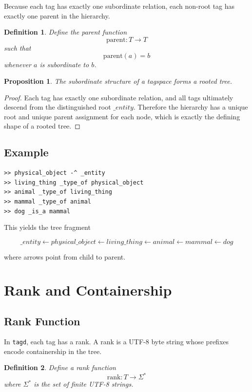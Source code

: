 \documentclass{article}
\newtheorem{definition}{Definition}[section]
\newtheorem{proposition}{Proposition}[section]
\begin{document}
Because each tag has exactly one subordinate relation, each non-root tag has
exactly one parent in the hierarchy.

\begin{definition}
Define the parent function
\[
\mathrm{parent}: T \to T
\]
such that
\[
\mathrm{parent}(a) = b
\]
whenever $a$ is subordinate to $b$.
\end{definition}

\begin{proposition}
The subordinate structure of a tagspace forms a rooted tree.
\end{proposition}

\begin{proof}
Each tag has exactly one subordinate relation, and all tags ultimately
descend from the distinguished root $\_entity$. Therefore the hierarchy has
a unique root and unique parent assignment for each node, which is exactly
the defining shape of a rooted tree.
\end{proof}

\subsection{Example}

\begin{verbatim}
>> physical_object -^ _entity
>> living_thing _type_of physical_object
>> animal _type_of living_thing
>> mammal _type_of animal
>> dog _is_a mammal
\end{verbatim}

This yields the tree fragment

\[
\_entity \leftarrow physical\_object \leftarrow living\_thing \leftarrow
animal \leftarrow mammal \leftarrow dog
\]

where arrows point from child to parent.

\section{Rank and Containership}

\subsection{Rank Function}

In \texttt{tagd}, each tag has a rank. A rank is a UTF-8 byte string whose
prefixes encode containership in the tree.

\begin{definition}
Define a rank function
\[
\mathrm{rank}: T \to \Sigma^{*}
\]
where $\Sigma^{*}$ is the set of finite UTF-8 strings.
\end{definition}
\end{document}
